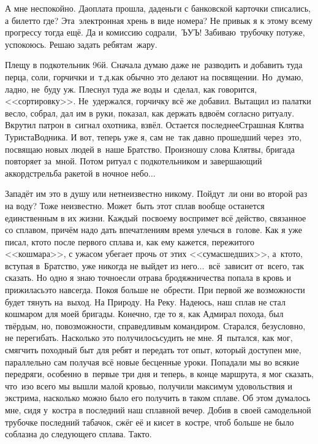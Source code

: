 А мне неспокойно. Да\mdash оплата прошла, да\mdash деньги с банковской карточки списались, а билет\sdash то где? Эта~электронная хрень в виде номера? Не привык я к этому всему прогрессу тогда ещё. Да и комиссию содрали,~ЪУЪ! Забиваю~трубочку потуже, успокоюсь. Решаю задать ребятам~жару.

Плещу в подкотельник 96\sdash й. Сначала думаю даже не~разводить и добавить туда перца, соли, горчички и~т.д.\mdash как обычно это делают на посвящении. Но~думаю, ладно, не~буду уж. Плеснул туда же воды и~сделал, как говорится, <<сортировку>>. Не~удержался, горчичку всё же добавил. Вытащил из палатки весло, собрал, дал им в руки, показал, как держать вдвоём согласно ритуалу. Вкрутил патрон в~сигнал охотника, взвёл. Остается последнее\mdash Страшная Клятва Туриста\sdash Водника. И вот, теперь уже я, сам не~так давно прошедший через~это, посвящаю новых людей в~наше Братство. Произношу слова Клятвы, бригада повторяет за~мной. Потом ритуал с подкотельником и завершающий аккорд\mdash стрельба ракетой в ночное небо$\ldots$   

Западёт им это в душу или нет\mdash неизвестно никому. Пойдут~ли они во второй раз на воду? Тоже неизвестно. Может~быть этот сплав вообще останется единственным в их жизни. Каждый~по\sdash своему воспримет всё действо, связанное со сплавом, причём надо дать впечатлениям время улечься в~голове. Как я уже писал, кто\sdash то после первого сплава и, как ему кажется, пережитого <<кошмара>>, с ужасом убегает прочь от этих <<сумасшедших>>, а~кто\sdash то, вступая в~Братство, уже никогда не выйдет из него$\ldots$~всё~зависит от~всего, так сказать. Но одно я знаю точно\mdash если отрава бродяжничества попала в кровь и прижилась\mdash это навсегда. Покоя больше не~обрести. При первой же возможности будет тянуть на~выход. На Природу. На Реку.
\newpage
Надеюсь, наш сплав не стал кошмаром для моей бригады. Конечно, где то я, как Адмирал похода, был твёрдым, но, по\sdash возможности, справедливым командиром. Старался, безусловно, не перегибать. Насколько это получилось\mdash судить не мне. Я~пытался, как мог, смягчить походный быт для ребят и передать тот опыт, который доступен мне, параллельно сам получая всё новые бесценные уроки. Попадали мы во всякие передряги, особенно в~первые три дня и теперь, в конце маршрута, я мог сказать, что~изо всего мы вышли малой кровью, получили максимум удовольствия и экстрима, насколько можно было его получить в таком сплаве. Об этом думалось мне, сидя у~костра в последний наш сплавной вечер. Добив в своей самодельной трубочке последний табачок, сжёг её и кисет в~костре, чтоб больше не было соблазна до следующего сплава. Так\sdash то. 

\begin{center}
\end{center}